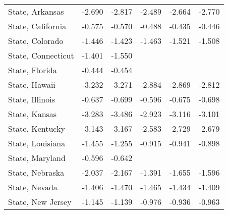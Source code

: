 {\begin{center}
{\begin{longtable}{l*{5}{c}}
\addlinespace
State, Arkansas          &      -2.690\sym{***}&      -2.817\sym{***}&      -2.489\sym{***}&      -2.664\sym{***}&      -2.770\sym{***}\\
\addlinespace
State, California        &      -0.575\sym{*}  &      -0.570\sym{**} &      -0.488\sym{*}  &      -0.435         &      -0.446         \\
\addlinespace
State, Colorado          &      -1.446\sym{**} &      -1.423\sym{**} &      -1.463\sym{**} &      -1.521\sym{***}&      -1.508\sym{***}\\
\addlinespace
State, Connecticut       &      -1.401         &      -1.550         &                     &                     &                     \\
\addlinespace
State, Florida           &      -0.444         &      -0.454         &                     &                     &                     \\
\addlinespace
State, Hawaii            &      -3.232\sym{***}&      -3.271\sym{***}&      -2.884\sym{***}&      -2.869\sym{***}&      -2.812\sym{***}\\
\addlinespace
State, Illinois          &      -0.637         &      -0.699\sym{*}  &      -0.596         &      -0.675\sym{*}  &      -0.698\sym{*}  \\
\addlinespace
State, Kansas            &      -3.283\sym{**} &      -3.486\sym{**} &      -2.923\sym{*}  &      -3.116\sym{**} &      -3.101\sym{*}  \\
\addlinespace
State, Kentucky          &      -3.143\sym{***}&      -3.167\sym{***}&      -2.583\sym{***}&      -2.729\sym{***}&      -2.679\sym{***}\\
\addlinespace
State, Louisiana         &      -1.455\sym{*}  &      -1.255\sym{*}  &      -0.915         &      -0.941         &      -0.898         \\
\addlinespace
State, Maryland          &      -0.596         &      -0.642         &                     &                     &                     \\
\addlinespace
State, Nebraska          &      -2.037\sym{*}  &      -2.167\sym{*}  &      -1.391         &      -1.655         &      -1.596         \\
\addlinespace
State, Nevada            &      -1.406         &      -1.470         &      -1.465         &      -1.434         &      -1.409         \\
\addlinespace
State, New Jersey        &      -1.145         &      -1.139         &      -0.976         &      -0.936         &      -0.963         \\

\end{longtable}}
\end{center}}
